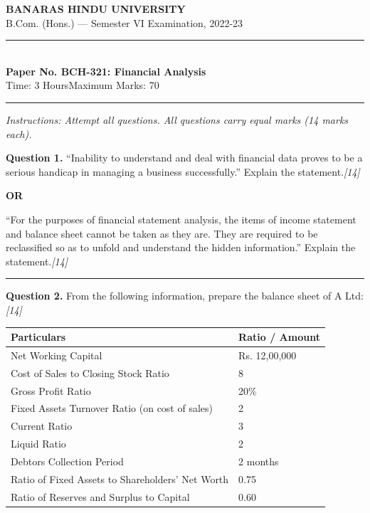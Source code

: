 \documentclass[11pt,a4paper]{article}
\newcommand{\pts}[1]{\hfill   \textit{[#1]}}
\begin{document}
\begin{center}
  {\large\bfseries BANARAS HINDU UNIVERSITY}\\[2pt]
  {\normalsize B.Com. (Hons.) --- Semester VI Examination, 2022-23}\\[6pt]
  \rule{0.8\linewidth}{0.5pt}\\[6pt]
  {\large\bfseries Paper No. BCH-321: Financial Analysis}\\[4pt]
  {\normalsize Time: 3 Hours\hfill Maximum Marks: 70}
\end{center}

\rule{\linewidth}{0.4pt}

\smallskip



\noindent   \textit{Instructions: Attempt all questions. All questions carry equal marks (14 marks each).}

\bigskip




\noindent   \textbf{Question 1.}
``Inability to understand and deal with financial data proves to be a serious handicap in managing a business successfully.'' Explain the statement.\pts{14}

\centerline{   \textbf{OR}}

``For the purposes of financial statement analysis, the items of income statement and balance sheet cannot be taken as they are. They are required to be reclassified so as to unfold and understand the hidden information.'' Explain the statement.\pts{14}

\medskip\rule{\linewidth}{0.2pt}




\noindent   \textbf{Question 2.}
From the following information, prepare the balance sheet of A Ltd:\pts{14}

\begin{center}

\begin{tabular}{ll}
  \hline
  Particulars & Ratio / Amount \\
  \hline
  Net Working Capital & Rs. 12,00,000 \\
  Cost of Sales to Closing Stock Ratio & 8 \\
  Gross Profit Ratio & 20\% \\
  Fixed Assets Turnover Ratio (on cost of sales) & 2 \\
  Current Ratio & 3 \\
  Liquid Ratio & 2 \\
  Debtors Collection Period & 2 months \\
  Ratio of Fixed Assets to Shareholders' Net Worth & 0.75 \\
  Ratio of Reserves and Surplus to Capital & 0.60 \\
  \hline
\end{tabular}
\end{center}
\end{document}
